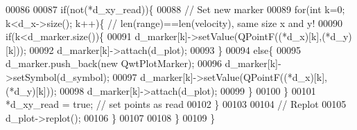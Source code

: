 \begin{DoxyCode}
00086             
00087             \textcolor{keywordflow}{if}(not(*d_xy_read))\{
00088                 \textcolor{comment}{// Set new marker}
00089                 \textcolor{keywordflow}{for}(\textcolor{keywordtype}{int} k=0; k<d_x->size(); k++)\{ \textcolor{comment}{// len(range)==len(velocity), same size x and y!}
00090                     \textcolor{keywordflow}{if}(k<d_marker.size())\{
00091                         d_marker[k]->setValue(QPointF((*d_x)[k],(*d_y)[k]));
00092                         d_marker[k]->attach(d_plot);
00093                     \}
00094                     \textcolor{keywordflow}{else}\{
00095                         d_marker.push\_back(\textcolor{keyword}{new} QwtPlotMarker);
00096                         d_marker[k]->setSymbol(d_symbol);
00097                         d_marker[k]->setValue(QPointF((*d_x)[k],(*d_y)[k]));
00098                         d_marker[k]->attach(d_plot);
00099                     \}
00100                 \}
00101                 *d_xy_read = \textcolor{keyword}{true}; \textcolor{comment}{// set points as read}
00102             \}
00103             
00104             \textcolor{comment}{// Replot}
00105             d_plot->replot();
00106         \}
00107 
00108     \}
00109 \}
\end{DoxyCode}
